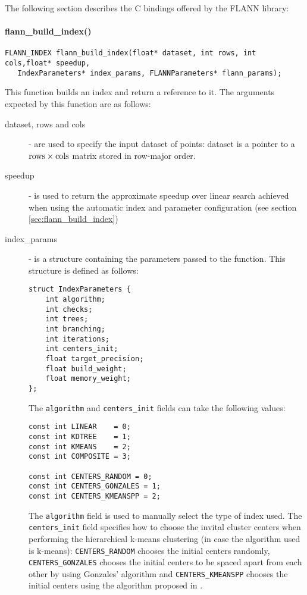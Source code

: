 \documentclass[letter,10pt]{article}
\begin{document}
The following section describes the C bindings offered by the FLANN
library:

\paragraph{flann\_build\_index()}
\begin{Verbatim}[fontsize=\footnotesize,frame=single]
FLANN_INDEX flann_build_index(float* dataset, int rows, int cols,float* speedup,
   IndexParameters* index_params, FLANNParameters* flann_params);
\end{Verbatim}
This function builds an index and return a reference to it. The arguments
expected by this function are as follows:
\begin{description}
 \item[dataset, rows and cols] - are used to specify the input dataset of
points: dataset is a pointer to a $\rm{rows} \times \rm{cols}$ matrix
stored in row-major order.
\item [speedup] - is used to return the approximate speedup over linear
search achieved when using the automatic index and parameter configuration
(see section \ref{sec:flann_build_index})
\item [index\_params] - is a structure containing the parameters passed to
the function. This structure is defined as follows:
\begin{Verbatim}[fontsize=\footnotesize]
struct IndexParameters {
    int algorithm;
    int checks;
    int trees;
    int branching;
    int iterations;
    int centers_init;
    float target_precision;
    float build_weight;
    float memory_weight;
};
\end{Verbatim}

The \texttt{algorithm} and \texttt{centers\_init} fields can take the
following values:
\begin{Verbatim}[fontsize=\footnotesize]
const int LINEAR    = 0;
const int KDTREE    = 1;
const int KMEANS    = 2;
const int COMPOSITE = 3;

const int CENTERS_RANDOM = 0;
const int CENTERS_GONZALES = 1;
const int CENTERS_KMEANSPP = 2;
\end{Verbatim}
The \texttt{algorithm} field is used to manually select the type of index
used. The \texttt{centers\_init} field specifies how to choose the invital
cluster centers when performing the hierarchical k-means clustering (in
case the algorithm used is k-means): \texttt{CENTERS\_RANDOM} chooses the
initial centers randomly, \texttt{CENTERS\_GONZALES} chooses the
initial centers to be spaced apart from each other by using Gonzales' algorithm
and \texttt{CENTERS\_KMEANSPP} chooses the initial centers using the algorithm
proposed in \cite{arthur_kmeanspp_2007}.


\end{description}
\end{document}

